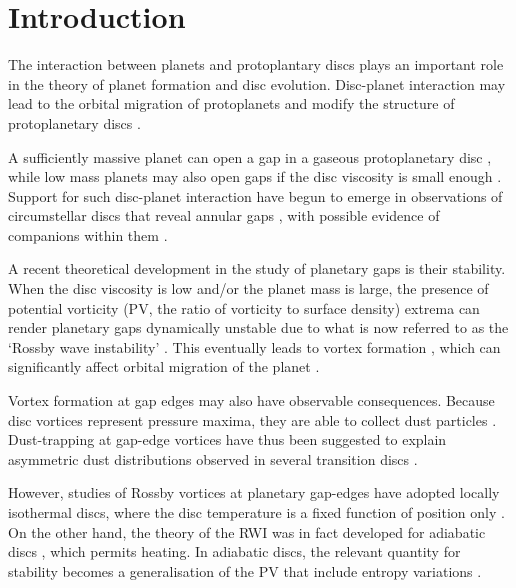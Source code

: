 \documentclass[useAMS,usenatbib]{mn2e}
\begin{document}
\section{Introduction}\label{intro}
The interaction between planets and protoplantary discs plays an
important role in the theory of planet formation and disc 
evolution. Disc-planet interaction may lead to the orbital migration
of protoplanets and modify the structure of
protoplanetary discs  \citep[see][for a recent review]{baruteau13}.  

A sufficiently massive planet can open a gap in a 
gaseous protoplanetary disc \citep{pap_lin84,bryden99,crida06,fung14}, 
while low mass planets may also open gaps if the disc viscosity is
small enough \citep{li09,dong11,duffell13}. Support for such disc-planet
interaction have begun to emerge in observations of circumstellar
discs that reveal annular gaps
\citep[e.g.][]{quanz13a,debes13,osorio14}, with possible evidence of
companions within them \citep[e.g.][]{quanz13b,reggiani14}. 


A recent theoretical development in the study of planetary gaps is
their stability. When the disc viscosity is low and/or the planet mass
is large, the presence of potential vorticity (PV, the ratio of
vorticity to surface density) extrema can render planetary gaps
dynamically unstable due to what is now referred to as the `Rossby
wave instability' \citep[RWI,][]{lovelace99,li00}. This 
eventually leads to vortex formation 
\citep{li01,koller03,li05,valborro07}, which can significantly affect
orbital migration of the planet  \citep{ou07,li09,yu10,lin10}. 

Vortex formation at gap edges may also have observable 
consequences. Because disc vortices represent pressure maxima, they are
able to collect dust particles 
\citep{barge95,inaba06,lyra13}. Dust-trapping at gap-edge vortices
have thus been suggested to explain asymmetric dust
distributions observed in several transition discs
\citep[e.g][]{marel13,isella13,perez14}. 

However, studies of Rossby vortices at planetary gap-edges have 
adopted locally isothermal discs, %
where the disc temperature is a fixed function of
position only \citep[e.g.][]{lyra08,lin11a,zhu14,fu14}. 
On the other hand, the theory of the RWI was in fact
developed for adiabatic discs \citep{li00}, which permits
heating. %
In adiabatic discs, the relevant quantity for stability
becomes a generalisation of the PV that include entropy variations
\citep{lovelace99}.   
\end{document}
